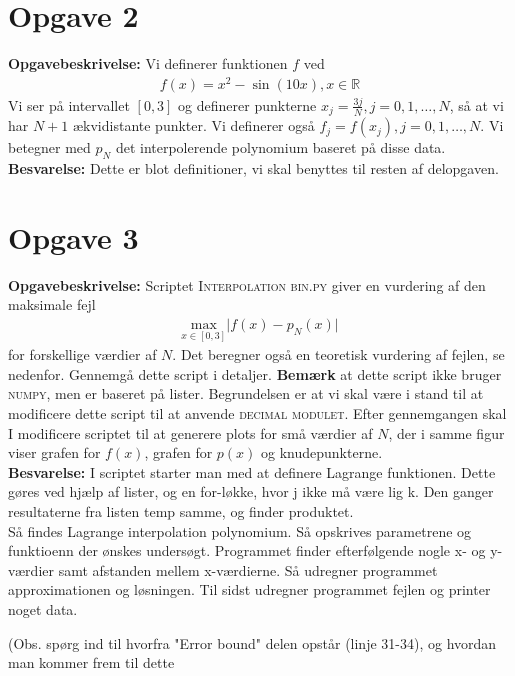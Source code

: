 \section*{Opgave 2}
\textbf{Opgavebeskrivelse:} Vi definerer funktionen $f$ ved
\begin{align*}
f(x)=x^2-\sin(10x), x \in \mathbb{R}
\end{align*}
Vi ser på intervallet $\left [0,3 \right ]$ og definerer punkterne $x_j = \frac{3j}{N}, j = 0, 1, \ldots, N$, så at vi har $N+1$ ækvidistante punkter. Vi definerer også $f_j=f(x_j), j=0,1,\ldots,N.$ Vi betegner med $p_N$ det interpolerende polynomium baseret på disse data.  
\\
\textbf{Besvarelse:} Dette er blot definitioner, vi skal benyttes til resten af delopgaven. 
\section*{Opgave 3}
\textbf{Opgavebeskrivelse:} Scriptet \textsc{Interpolation bin.py} giver en vurdering af den maksimale fejl 
\begin{align*}
\underset{x \in \left [0,3 \right ]}{\text{max}} \lvert f(x)-p_N(x) \rvert
\end{align*}
for forskellige værdier af $N$. Det beregner også en teoretisk vurdering af fejlen, se nedenfor. Gennemgå dette script i detaljer. \textbf{Bemærk} at dette script ikke bruger \textsc{numpy}, men er baseret på lister. Begrundelsen er at vi skal være i stand til at modificere dette script til at anvende \textsc{decimal modulet}. Efter gennemgangen skal I modificere scriptet til at generere plots for små værdier af $N$, der i samme figur viser grafen for $f(x)$, grafen for $p(x)$ og knudepunkterne.
\\
\textbf{Besvarelse:} I scriptet starter man med at definere Lagrange funktionen. Dette gøres ved hjælp af lister, og en for-løkke, hvor j ikke må være lig k. Den ganger resultaterne fra listen temp samme, og finder produktet.\\
Så findes Lagrange interpolation polynomium. Så opskrives parametrene og funktioenn der ønskes undersøgt. Programmet finder efterfølgende nogle x- og y-værdier samt afstanden mellem x-værdierne. Så udregner programmet approximationen og løsningen. Til sidst udregner programmet fejlen og printer noget data. 

(Obs. spørg ind til hvorfra "Error bound" delen opstår (linje 31-34), og hvordan man kommer frem til dette 

